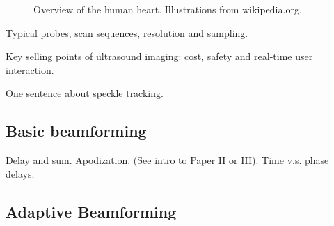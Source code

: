 \begin{figure}
\centering
{}
\caption{Overview of the human heart. Illustrations from wikipedia.org.}
\label{fig:human_heart}
\end{figure}

Typical probes, scan sequences, resolution and sampling.

Key selling points of ultrasound imaging: cost, safety and real-time user interaction.

One sentence about speckle tracking.
							
\subsection{Basic beamforming}

Delay and sum. Apodization. (See intro to Paper II or III).
Time v.s. phase delays.

\subsection{Adaptive Beamforming}\label{sec:adaptbf}

